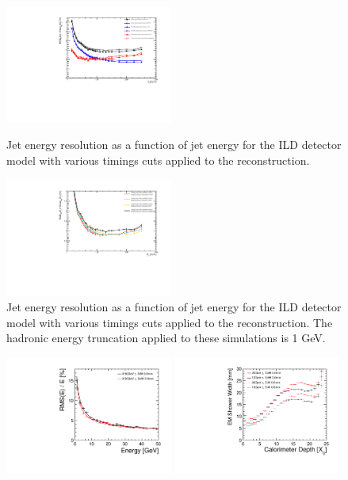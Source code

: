 \documentclass[final,3p,times,twocolumn]{elsarticle}
\begin{document}
\begin{figure}[!h]
  \begin{center}
     \includegraphics[width=0.49\textwidth]{4_BasicDetPerf/JER_vs_Ej_Default_Detector_Default_Reco.pdf}
     \caption{Jet energy resolution as a function of jet energy for the ILD detector model with various timings cuts applied to the reconstruction.  \label{4-HET}}
     \includegraphics[width=0.49\textwidth]{4_BasicDetPerf/JER_vs_Ej_LCWS_Plot.pdf}
     \caption{Jet energy resolution as a function of jet energy for the ILD detector model with various timings cuts applied to the reconstruction.  The hadronic energy truncation applied to these simulations is 1 GeV.  \label{4-HET2}}
  \end{center}
\end{figure}


\begin{figure}[!h]
  \begin{center}
     \includegraphics[width=0.49\textwidth]{ERes_vs_Egamma.pdf}
     \includegraphics[width=0.49\textwidth]{SiSc_TProfile.pdf}
     \caption{\label{}}
  \end{center}
\end{figure}
\end{document}
